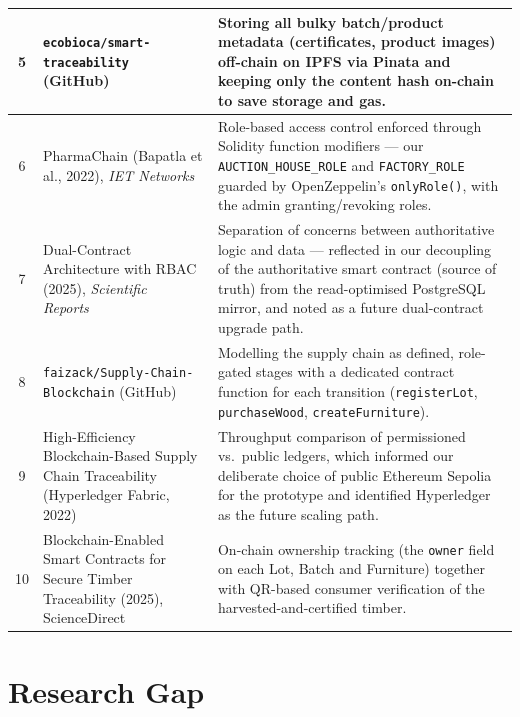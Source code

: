 \begin{longtable}{|c|p{5.1cm}|p{6.6cm}|}
  5 & \texttt{ecobioca/smart-traceability} (GitHub)~\cite{smarttraceability} &
  Storing all bulky batch/product metadata (certificates, product
  images) off-chain on IPFS via Pinata and keeping only the content
  hash on-chain to save storage and gas. \\
  \hline

  6 & PharmaChain (Bapatla et al., 2022), \emph{IET
  Networks}~\cite{pharmachain} &
  Role-based access control enforced through Solidity function
  modifiers --- our \texttt{AUCTION\_HOUSE\_ROLE} and
  \texttt{FACTORY\_ROLE} guarded by OpenZeppelin's
  \texttt{onlyRole()}, with the admin granting/revoking roles. \\
  \hline

  7 & Dual-Contract Architecture with RBAC (2025), \emph{Scientific
  Reports}~\cite{dualcontract} &
  Separation of concerns between authoritative logic and data ---
  reflected in our decoupling of the authoritative smart contract (source
  of truth) from the read-optimised PostgreSQL mirror, and noted as a
  future dual-contract upgrade path. \\
  \hline

  8 & \texttt{faizack/Supply-Chain-Blockchain} (GitHub)~\cite{faizack} &
  Modelling the supply chain as defined, role-gated stages with a
  dedicated contract function for each transition
  (\texttt{registerLot}, \texttt{purchaseWood},
  \texttt{createFurniture}). \\
  \hline

  9 & High-Efficiency Blockchain-Based Supply Chain Traceability
  (Hyperledger Fabric, 2022)~\cite{hyperledger} &
  Throughput comparison of permissioned vs.\ public ledgers, which
  informed our deliberate choice of public Ethereum Sepolia for the
  prototype and identified Hyperledger as the future scaling path. \\
  \hline

  10 & Blockchain-Enabled Smart Contracts for Secure Timber
  Traceability (2025), ScienceDirect~\cite{timberSC2025} &
  On-chain ownership tracking (the \texttt{owner} field on each Lot,
  Batch and Furniture) together with QR-based consumer verification of
  the harvested-and-certified timber. \\
  \hline

\end{longtable}
\renewcommand{\arraystretch}{1.0}

\section{Research Gap}


